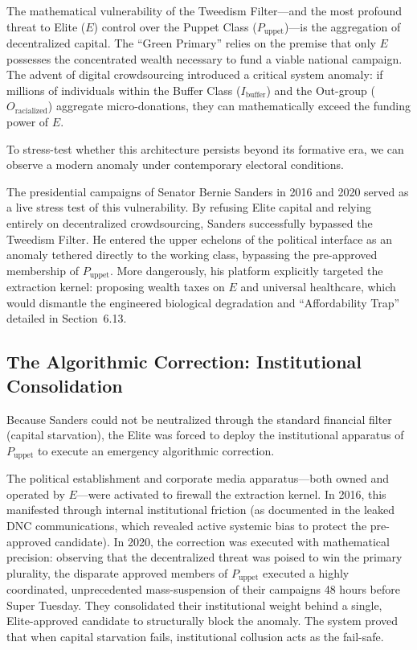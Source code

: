 The mathematical vulnerability of the Tweedism Filter---and the most profound threat to Elite ($E$) control over the Puppet Class ($P_{\text{uppet}}$)---is the aggregation of decentralized capital. The ``Green Primary'' relies on the premise that only $E$ possesses the concentrated wealth necessary to fund a viable national campaign. The advent of digital crowdsourcing introduced a critical system anomaly: if millions of individuals within the Buffer Class ($I_{\text{buffer}}$) and the Out-group ($O_{\text{racialized}}$) aggregate micro-donations, they can mathematically exceed the funding power of $E$.

To stress-test whether this architecture persists beyond its formative era, we can observe a modern anomaly under contemporary electoral conditions.

The presidential campaigns of Senator Bernie Sanders in 2016 and 2020 served as a live stress test of this vulnerability. By refusing Elite capital and relying entirely on decentralized crowdsourcing, Sanders successfully bypassed the Tweedism Filter. He entered the upper echelons of the political interface as an anomaly tethered directly to the working class, bypassing the pre-approved membership of $P_{\text{uppet}}$. More dangerously, his platform explicitly targeted the extraction kernel: proposing wealth taxes on $E$ and universal healthcare, which would dismantle the engineered biological degradation and ``Affordability Trap'' detailed in Section~6.13.

\subsection{The Algorithmic Correction: Institutional Consolidation}

Because Sanders could not be neutralized through the standard financial filter (capital starvation), the Elite was forced to deploy the institutional apparatus of $P_{\text{uppet}}$ to execute an emergency algorithmic correction.

The political establishment and corporate media apparatus---both owned and operated by $E$---were activated to firewall the extraction kernel. In 2016, this manifested through internal institutional friction (as documented in the leaked DNC communications, which revealed active systemic bias to protect the pre-approved candidate). In 2020, the correction was executed with mathematical precision: observing that the decentralized threat was poised to win the primary plurality, the disparate approved members of $P_{\text{uppet}}$ executed a highly coordinated, unprecedented mass-suspension of their campaigns 48 hours before Super Tuesday. They consolidated their institutional weight behind a single, Elite-approved candidate to structurally block the anomaly. The system proved that when capital starvation fails, institutional collusion acts as the fail-safe.


